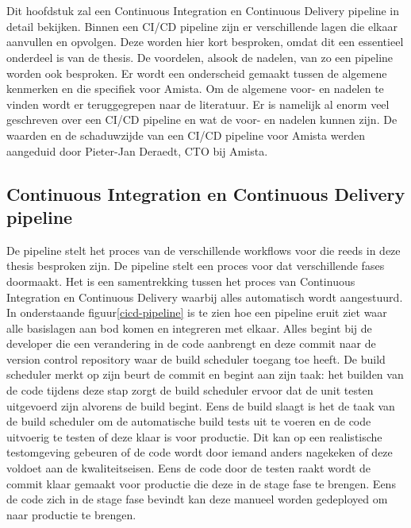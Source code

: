 
\chapter{}
\label{ch:cicd-pipeline}
Dit hoofdstuk zal een Continuous Integration en Continuous Delivery pipeline in detail bekijken. Binnen een CI/CD pipeline zijn er verschillende lagen die elkaar aanvullen en opvolgen. Deze worden hier kort besproken, omdat dit een essentieel onderdeel is van de thesis. De voordelen, alsook de nadelen, van zo een pipeline worden ook besproken. Er wordt een onderscheid gemaakt tussen de algemene kenmerken en die specifiek voor Amista. Om de algemene voor- en nadelen te vinden wordt er teruggegrepen naar de literatuur. Er is namelijk al enorm veel geschreven over een CI/CD pipeline en wat de voor- en nadelen kunnen zijn. De waarden en de schaduwzijde van een CI/CD pipeline voor Amista werden aangeduid door Pieter-Jan Deraedt, CTO bij Amista.

\section{Continuous Integration en Continuous Delivery pipeline}
De pipeline stelt het proces van de verschillende workflows voor die reeds in deze thesis besproken zijn. De pipeline stelt een proces voor dat verschillende fases doormaakt. Het is een samentrekking tussen het proces van Continuous Integration en Continuous Delivery waarbij alles automatisch wordt aangestuurd. In onderstaande figuur\ref{cicd-pipeline} is te zien hoe een pipeline eruit ziet waar alle basislagen aan bod komen en integreren met elkaar.
Alles begint bij de developer die een verandering in de code aanbrengt en deze commit naar de version control repository waar de build scheduler toegang toe heeft. De build scheduler merkt op zijn beurt de commit en begint aan zijn taak: het builden van de code tijdens deze stap zorgt de build scheduler ervoor dat de unit testen uitgevoerd zijn alvorens de build begint. Eens de build slaagt is het de taak van de build scheduler om de automatische build tests uit te voeren en de code uitvoerig te testen of deze klaar is voor productie. Dit kan op een realistische testomgeving gebeuren of de code wordt door iemand anders nagekeken of deze voldoet aan de kwaliteitseisen. Eens de code door de testen raakt wordt de commit klaar gemaakt voor productie die deze in de stage fase te brengen. Eens de code zich in de stage fase bevindt kan deze manueel worden gedeployed om naar productie te brengen.

